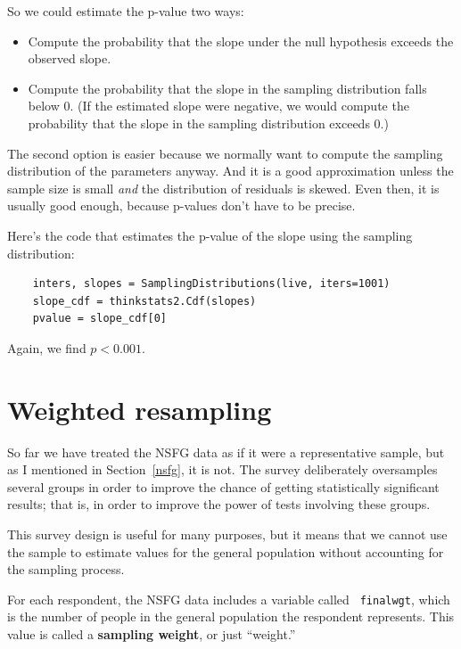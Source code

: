 \documentclass[12pt]{book}
\begin{document}
So we could estimate the p-value two ways:

\begin{itemize}

\item Compute the probability that the slope under the null
hypothesis exceeds the observed slope.

\item Compute the probability that the slope in the sampling
distribution falls below 0.  (If the estimated slope were negative,
we would compute the probability that the slope in the sampling
distribution exceeds 0.)

\end{itemize}

The second option is easier because we normally want to compute the
sampling distribution of the parameters anyway.  And it is a good
approximation unless the sample size is small {\em and} the
distribution of residuals is skewed.  Even then, it is usually good
enough, because p-values don't have to be precise.

Here's the code that estimates the p-value of the slope using the
sampling distribution:

\begin{verbatim}
    inters, slopes = SamplingDistributions(live, iters=1001)
    slope_cdf = thinkstats2.Cdf(slopes)
    pvalue = slope_cdf[0]
\end{verbatim}

Again, we find $p < 0.001$.  


\section{Weighted resampling}
\label{weighted}

So far we have treated the NSFG data as if it were a representative
sample, but as I mentioned in Section~\ref{nsfg}, it is not.  The
survey deliberately oversamples several groups in order to
improve the chance of getting statistically significant results; that
is, in order to improve the power of tests involving these groups.
   

This survey design is useful for many purposes, but it means that we
cannot use the sample to estimate values for the general
population without accounting for the sampling process.

For each respondent, the NSFG data includes a variable called {\tt
  finalwgt}, which is the number of people in the general population
the respondent represents.  This value is called a {\bf sampling
  weight}, or just ``weight.''
\end{document}
